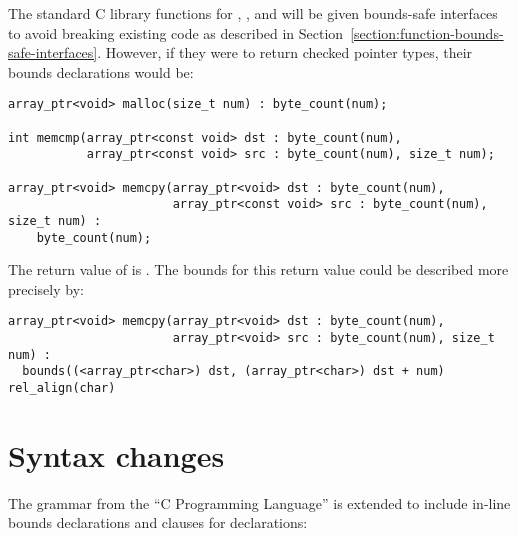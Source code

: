 The standard C library functions for , , and
 will be
given bounds-safe interfaces to avoid breaking existing code as
described in Section~\ref{section:function-bounds-safe-interfaces}. 
However, if they were to return checked pointer
types, their bounds declarations would be:

\begin{lstlisting}
array_ptr<void> malloc(size_t num) : byte_count(num);

int memcmp(array_ptr<const void> dst : byte_count(num),
           array_ptr<const void> src : byte_count(num), size_t num);

array_ptr<void> memcpy(array_ptr<void> dst : byte_count(num),
                       array_ptr<const void> src : byte_count(num), size_t num) :
    byte_count(num);
\end{lstlisting}

The return value of  is . The bounds for
this return value could be described more precisely by:

\begin{lstlisting}
array_ptr<void> memcpy(array_ptr<void> dst : byte_count(num),
                       array_ptr<void> src : byte_count(num), size_t num) :
  bounds((<array_ptr<char>) dst, (array_ptr<char>) dst + num) rel_align(char)
\end{lstlisting}
\section{Syntax changes}
The grammar from the ``C Programming Language'' \cite{Ritchie1988} is extended to include
in-line bounds declarations and  clauses for declarations:

